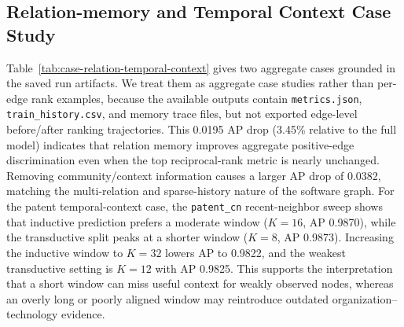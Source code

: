 \subsection{Relation-memory and Temporal Context Case Study}
Table~\ref{tab:case-relation-temporal-context} gives two aggregate cases grounded in the saved run artifacts. 
We treat them as aggregate case studies rather than per-edge rank examples, because the available outputs contain \texttt{metrics.json}, \texttt{train\_history.csv}, and memory trace files, but not exported edge-level before/after ranking trajectories. 
This 0.0195 AP drop (3.45\% relative to the full model) indicates that relation memory improves aggregate positive-edge discrimination even when the top reciprocal-rank metric is nearly unchanged. 
Removing community/context information causes a larger AP drop of 0.0382, matching the multi-relation and sparse-history nature of the software graph.
For the patent temporal-context case, the \texttt{patent\_cn} recent-neighbor sweep shows that inductive prediction prefers a moderate window ($K=16$, AP 0.9870), while the transductive split peaks at a shorter window ($K=8$, AP 0.9873). 
Increasing the inductive window to $K=32$ lowers AP to 0.9822, and the weakest transductive setting is $K=12$ with AP 0.9825. 
This supports the interpretation that a short window can miss useful context for weakly observed nodes, whereas an overly long or poorly aligned window may reintroduce outdated organization--technology evidence.



